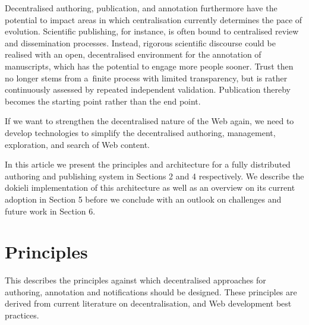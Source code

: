 \documentclass[a4paper]{llncs}
\begin{document}
                            
\par 
                                Decentralised authoring, publication, and annotation
                                furthermore have the potential to impact areas
                                in which centralisation currently determines the pace of evolution.
                                Scientific publishing, for instance,
                                is often bound to centralised review and dissemination processes.
                                Instead, rigorous scientific discourse could be realised
                                with an open, decentralised environment for the annotation of manuscripts,
                                which has the potential to engage more people sooner.
                                Trust then no longer stems from a finite process with limited transparency,
                                but is rather continuously assessed by repeated independent validation.
                                Publication thereby becomes the starting point rather than the end point.
                            
                            
\par 
                                If we want to strengthen the decentralised nature of the Web again,
                                we need to develop technologies to simplify the decentralised authoring, management,
                                exploration, and search of Web content.
                            

                            
\par In this article we present the principles and architecture for a fully distributed authoring and publishing system in Sections 2 and 4 respectively. We describe the dokieli implementation of this architecture as well as an overview on its current adoption in Section 5 before we conclude with an outlook on challenges and future work in Section 6.
                        
                    

                    
                        \section{Principles}
  \label{principles}

                        
                            
\par 
                                This describes the principles against which
                                decentralised approaches for authoring, annotation and notifications
                                should be designed. These principles are derived from current literature
                                on decentralisation, and Web development best practices.
                            
\end{document}
